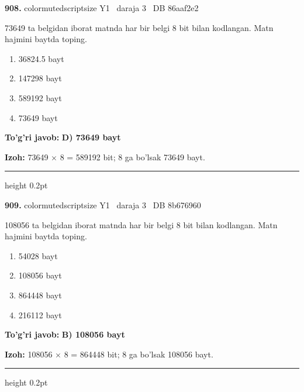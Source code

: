 \documentclass[10pt,a4paper,oneside]{article}
\begin{document}
\noindent\textbf{\color{ink}908.}  {color{muted}scriptsize Y1 \textbullet\ daraja 3 \textbullet\ DB 86aaf2e2}
\par
73649 ta belgidan iborat matnda har bir belgi 8 bit bilan kodlangan. Matn hajmini baytda toping.
\begin{enumerate}[label=\Alph*),leftmargin=9mm]
\item 36824.5 bayt
\item 147298 bayt
\item 589192 bayt
\item 73649 bayt
\end{enumerate}
\begin{tcolorbox}[enhanced,breakable,colback=teal!4,colframe=teal!50!black,boxrule=0.5pt,arc=1.1mm,left=3mm,right=3mm,top=1.7mm,bottom=1.7mm,before skip=2mm,after skip=2mm]
\textbf{\color{teal}To'g'ri javob:} \textbf{D) 73649 bayt}
\par\smallskip
\textbf{Izoh:} 73649 \ensuremath{\times} 8 = 589192 bit; 8 ga bo'lsak 73649 bayt.
\end{tcolorbox}
\vspace{2mm}\hrule height 0.2pt \vspace{3mm}

\noindent\textbf{\color{ink}909.}  {color{muted}scriptsize Y1 \textbullet\ daraja 3 \textbullet\ DB 8b676960}
\par
108056 ta belgidan iborat matnda har bir belgi 8 bit bilan kodlangan. Matn hajmini baytda toping.
\begin{enumerate}[label=\Alph*),leftmargin=9mm]
\item 54028 bayt
\item 108056 bayt
\item 864448 bayt
\item 216112 bayt
\end{enumerate}
\begin{tcolorbox}[enhanced,breakable,colback=teal!4,colframe=teal!50!black,boxrule=0.5pt,arc=1.1mm,left=3mm,right=3mm,top=1.7mm,bottom=1.7mm,before skip=2mm,after skip=2mm]
\textbf{\color{teal}To'g'ri javob:} \textbf{B) 108056 bayt}
\par\smallskip
\textbf{Izoh:} 108056 \ensuremath{\times} 8 = 864448 bit; 8 ga bo'lsak 108056 bayt.
\end{tcolorbox}
\vspace{2mm}\hrule height 0.2pt \vspace{3mm}
\end{document}
